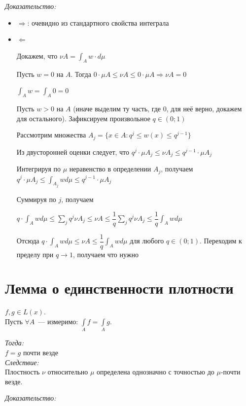 \documentclass[paper=a4, fontsize=17pt]{article}
\begin{document}
	\emph{Доказательство:}
	 	\begin{itemize}
	 		\item $\Rightarrow$: очевидно из стандартного свойства интеграла
	 		\item $\Leftarrow$\par
	 		Докажем, что $\nu A = \int_A w \cdot d \mu$
	 		
	 		Пусть $w = 0$ на $A$. Тогда $0 \cdot \mu A \leqslant \nu A \leqslant 0 \cdot \mu A \Rightarrow \nu A = 0$
	 		
	 		$\int_A w = \int_A 0 = 0$
	 		
	 		Пусть $w > 0$ на $A$ (иначе выделим ту часть, где 0, для неё верно, докажем для остального). Зафиксируем произвольное $q \in  (0; 1)$
	 		
	 		Рассмотрим множества $A_j = \{x \in A: q^j \leqslant w(x) \leqslant q^{j - 1}\}$
	 		
	 		Из двусторонней оценки следует, что $q^j \cdot \mu A_j \leqslant \nu A_j \leqslant q^{j - 1} \cdot \mu A_j$
	
			Интегрируя по $\mu$ неравенство в определении $A_j$, получаем \newline $q^j \cdot \mu A_j \leqslant \int_{A_j} w d \mu \leqslant q^{j - 1} \cdot \mu A_j$
			
			Суммируя по $j$, получаем
			
			$q \cdot \int_A w d \mu \leqslant \sum\limits_{j} q^j \nu A_j \leqslant \nu A \leqslant \dfrac{1}{q} \sum\limits_{j} q^j \nu A_j \leqslant \dfrac{1}{q} \int_A w d \mu$
			
			Отсюда $q \cdot \int_A w d \mu \leqslant \nu A \leqslant \dfrac{1}{q} \int_A w d \mu$ для любого $q \in (0; 1)$. Переходим к пределу при $q \rightarrow 1$, получаем что нужно
	 	\end{itemize}

\section{Лемма о единственности плотности}
	$f, g \in L(x)$. \\
	Пусть $\forall A$~--- измеримо: $\int\limits_A f = \int\limits_A g$.

	\emph{Тогда: } \\
		$f = g$ почти везде \\
	\emph{Следствие: } \\
		Плостность $\nu$ относительно $\mu$ определена однозначно с точностью до $\mu$-почти везде.

	\emph{Доказательство: }
\end{document}
